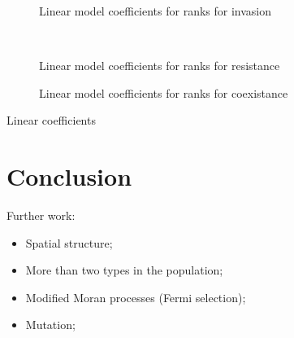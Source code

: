 \documentclass{article}
\begin{document}
\begin{table}[!hbtp]
    \centering
    \begin{subfigure}{.5\textwidth}
        \centering
        
        \caption{Linear model coefficients for ranks for invasion}
        \label{tbl:linear_coeficients_invasion}
    \end{subfigure}%
    ~
    \begin{subfigure}{.5\textwidth}
        \centering
        
        \caption{Linear model coefficients for ranks for resistance}
        \label{tbl:linear_coeficients_resistance}
    \end{subfigure}

    \begin{subfigure}{.5\textwidth}
        \centering
        
        \caption{Linear model coefficients for ranks for coexistance}
        \label{tbl:linear_coeficients_coexist}
    \end{subfigure}
    \caption{Linear coefficients}
\end{table}




\section{Conclusion}\label{sec:conclusion}


Further work:

\begin{itemize}
    \item Spatial structure;
    \item More than two types in the population;
    \item Modified Moran processes (Fermi selection);
    \item Mutation;
\end{itemize}
\end{document}
